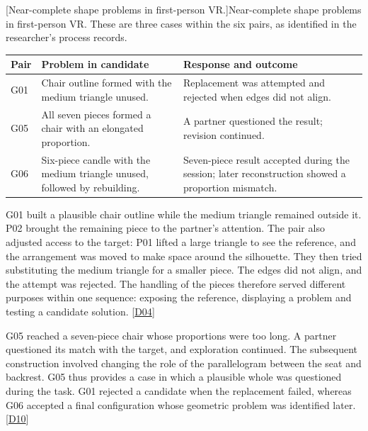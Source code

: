 \par\addvspace{8pt}
\noindent\begin{minipage}{\linewidth}
\begingroup
\centering
{}
\fontsize{10}{12.3}\selectfont
\setlength{\tabcolsep}{2.2pt}
\renewcommand{\arraystretch}{1.18}
[Near-complete shape problems in first-person VR.]{Near-complete shape problems in first-person VR. These are three cases within the six pairs, as identified in the researcher's process records.}\label{tab:5-1}
\begin{tabular}{@{}>{\raggedright\arraybackslash}p{16.614mm}>{\raggedright\arraybackslash}p{62.763mm}>{\raggedright\arraybackslash}p{77.531mm}@{}}
\toprule
\textbf{Pair} & \textbf{Problem in candidate} & \textbf{Response and outcome} \\
\midrule
G01 & Chair outline formed with the medium triangle unused. & Replacement was attempted and rejected when edges did not align. \\
\addlinespace[3pt]
G05 & All seven pieces formed a chair with an elongated proportion. & A partner questioned the result; revision continued. \\
\addlinespace[3pt]
G06 & Six-piece candle with the medium triangle unused, followed by rebuilding. & Seven-piece result accepted during the session; later reconstruction showed a proportion mismatch. \\
\bottomrule
\end{tabular}
\par\endgroup
\end{minipage}\par\addvspace{8pt}

G01 built a plausible chair outline while the medium triangle remained outside it. P02 brought the remaining piece to the partner's attention. The pair also adjusted access to the target: P01 lifted a large triangle to see the reference, and the arrangement was moved to make space around the silhouette. They then tried substituting the medium triangle for a smaller piece. The edges did not align, and the attempt was rejected. The handling of the pieces therefore served different purposes within one sequence: exposing the reference, displaying a problem and testing a candidate solution. [\hyperlink{src:D04}{D04}]

G05 reached a seven-piece chair whose proportions were too long. A partner questioned its match with the target, and exploration continued. The subsequent construction involved changing the role of the parallelogram between the seat and backrest. G05 thus provides a case in which a plausible whole was questioned during the task. G01 rejected a candidate when the replacement failed, whereas G06 accepted a final configuration whose geometric problem was identified later. [\hyperlink{src:D10}{D10}]

